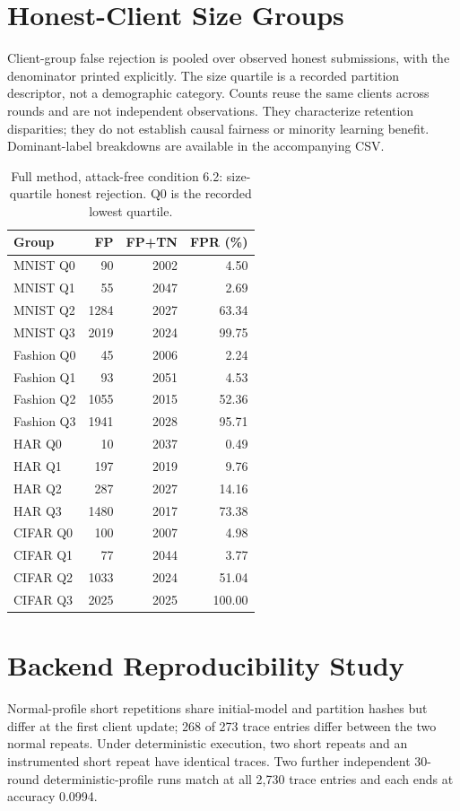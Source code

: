 \documentclass[journal]{IEEEtran}
\begin{document}
\section{Honest-Client Size Groups}
Client-group false rejection is pooled over observed honest submissions, with the denominator printed explicitly. The size quartile is a recorded partition descriptor, not a demographic category. Counts reuse the same clients across rounds and are not independent observations. They characterize retention disparities; they do not establish causal fairness or minority learning benefit. Dominant-label breakdowns are available in the accompanying CSV.
\begin{table}[!t]
\centering\scriptsize
\caption{Full method, attack-free condition 6.2: size-quartile honest rejection. Q0 is the recorded lowest quartile.}
\begin{tabular}{lrrr}
\toprule
Group & FP & FP+TN & FPR (\%) \\
\midrule
MNIST Q0 & 90 & 2002 & 4.50 \\
MNIST Q1 & 55 & 2047 & 2.69 \\
MNIST Q2 & 1284 & 2027 & 63.34 \\
MNIST Q3 & 2019 & 2024 & 99.75 \\
Fashion Q0 & 45 & 2006 & 2.24 \\
Fashion Q1 & 93 & 2051 & 4.53 \\
Fashion Q2 & 1055 & 2015 & 52.36 \\
Fashion Q3 & 1941 & 2028 & 95.71 \\
HAR Q0 & 10 & 2037 & 0.49 \\
HAR Q1 & 197 & 2019 & 9.76 \\
HAR Q2 & 287 & 2027 & 14.16 \\
HAR Q3 & 1480 & 2017 & 73.38 \\
CIFAR Q0 & 100 & 2007 & 4.98 \\
CIFAR Q1 & 77 & 2044 & 3.77 \\
CIFAR Q2 & 1033 & 2024 & 51.04 \\
CIFAR Q3 & 2025 & 2025 & 100.00 \\
\bottomrule
\end{tabular}
\end{table}
\section{Backend Reproducibility Study}
Normal-profile short repetitions share initial-model and partition hashes but differ at the first client update; 268 of 273 trace entries differ between the two normal repeats. Under deterministic execution, two short repeats and an instrumented short repeat have identical traces. Two further independent 30-round deterministic-profile runs match at all 2,730 trace entries and each ends at accuracy 0.0994.
\end{document}
